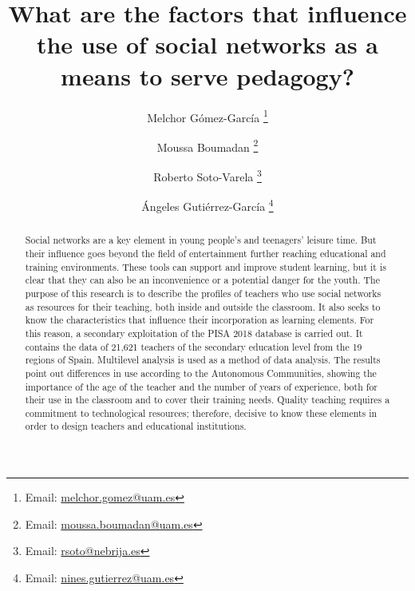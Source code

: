 \documentclass{textolivre}
\title{What are the factors that influence the use of social networks as a means to serve pedagogy?}
\author[1]{Melchor Gómez-García \orcid{0000-0003-3453-218X} \thanks{Email: \url{melchor.gomez@uam.es}}}
\author[1]{Moussa Boumadan \orcid{0000-0003-3334-1007} \thanks{Email: \url{moussa.boumadan@uam.es}}}
\author[2]{Roberto Soto-Varela \orcid{0000-0003-2105-5580} \thanks{Email: \url{rsoto@nebrija.es}}}
\author[1]{Ángeles Gutiérrez-García \orcid{0000-0001-7376-6064} \thanks{Email: \url{nines.gutierrez@uam.es}}}
\affil[1]{Universidad Autónoma de Madrid, Espanha.}
\affil[2]{Nebrija University, Espanha.}
\begin{document}
\maketitle

\begin{polyabstract}
\begin{english}
\begin{abstract}
Social networks are a key element in young people's and teenagers' leisure time. But their influence goes beyond the field of entertainment further reaching educational and training environments. These tools can support and improve student learning, but it is clear that they can also be an inconvenience or a potential danger for the youth. The purpose of this research is to describe the profiles of teachers who use social networks as resources for their teaching, both inside and outside the classroom. It also seeks to know the characteristics that influence their incorporation as learning elements. For this reason, a secondary exploitation of the PISA 2018 database is carried out. It contains the data of 21,621 teachers of the secondary education level from the 19 regions of Spain. Multilevel analysis is used as a method of data analysis. The results point out differences in use according to the Autonomous Communities, showing the importance of the age of the teacher and the number of years of experience, both for their use in the classroom and to cover their training needs. Quality teaching requires a commitment to technological resources; therefore, decisive to know these elements in order to design teachers and educational institutions.

\end{abstract}
\end{english}


\end{polyabstract}
\end{document}
